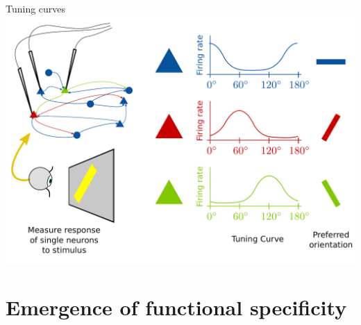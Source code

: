 \documentclass[xcolor=x11names,compress]{beamer}
\renewcommand{\(}{\begin{columns}}
\renewcommand{\)}{\end{columns}}
\newcommand{\<}[1]{\begin{column}{#1}}
\renewcommand{\>}{\end{column}}
\begin{document}
\begin{frame}[t]{Tuning curves}
    \includegraphics[height=0.9\textheight]{tuning_curves}
\end{frame}


\section{Emergence of functional specificity}
\label{sec:emergence_of_functional_microcircuits}
\end{document}
